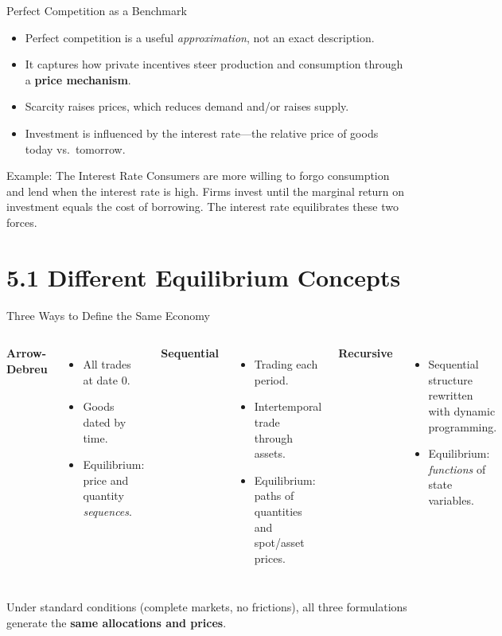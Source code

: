 \documentclass[aspectratio=169,10pt]{beamer}
\begin{document}
\begin{frame}{Perfect Competition as a Benchmark}
\begin{itemize}
  \item Perfect competition is a useful \emph{approximation}, not an exact description.
  \item It captures how private incentives steer production and consumption through a \textbf{price mechanism}.
  \item Scarcity raises prices, which reduces demand and/or raises supply.
  \item Investment is influenced by the interest rate---the relative price of goods today vs.\ tomorrow.
\end{itemize}

\begin{block}{Example: The Interest Rate}
Consumers are more willing to forgo consumption and lend when the interest rate is high. Firms invest until the marginal return on investment equals the cost of borrowing. The interest rate equilibrates these two forces.
\end{block}
\end{frame}

\section{5.1 Different Equilibrium Concepts}

\begin{frame}{Three Ways to Define the Same Economy}
\begin{columns}[T]
\textbf{Arrow-Debreu}
\begin{itemize}
  \item All trades at date 0.
  \item Goods dated by time.
  \item Equilibrium: price and quantity \emph{sequences}.
\end{itemize}

\textbf{Sequential}
\begin{itemize}
  \item Trading each period.
  \item Intertemporal trade through assets.
  \item Equilibrium: paths of quantities and spot/asset prices.
\end{itemize}

\textbf{Recursive}
\begin{itemize}
  \item Sequential structure rewritten with dynamic programming.
  \item Equilibrium: \emph{functions} of state variables.
\end{itemize}
\end{columns}

\medskip
Under standard conditions (complete markets, no frictions), all three formulations generate the \textbf{same allocations and prices}.
\end{frame}
\end{document}
